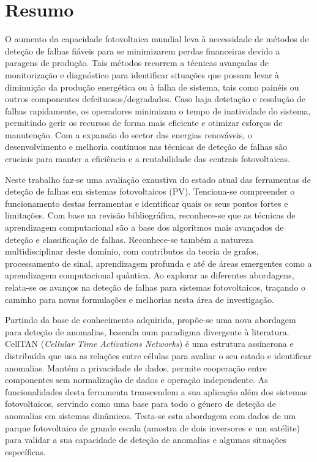 \chapter*{Resumo}

O aumento da capacidade fotovoltaica mundial leva à necessidade de métodos de deteção de falhas fiáveis para se minimizarem perdas financeiras devido a paragens de produção. Tais métodos recorrem a técnicas avançadas de monitorização e diagnóstico para identificar situações que possam levar à diminuição da produção energética ou à falha de sistema, tais como painéis ou outros componentes defeituosos/degradados. Caso haja detetação e resolução de falhas rapidamente, os operadores minimizam o tempo de inatividade do sistema, permitindo gerir os recursos de forma mais eficiente e otimizar esforços de manutenção. Com a expansão do sector das energias renováveis, o desenvolvimento e melhoria contínuos nas técnicas de deteção de falhas são cruciais para manter a eficiência e a rentabilidade das centrais fotovoltaicas.

Neste trabalho faz-se uma avaliação exaustiva do estado atual das ferramentas de deteção de falhas em sistemas fotovoltaicos (PV). Tenciona-se compreender o funcionamento destas ferramentas e identificar quais os seus pontos fortes e limitações. Com base na revisão bibliográfica, reconhece-se que as técnicas de aprendizagem computacional são a base dos algoritmos mais avançados de deteção e classificação de falhas. Reconhece-se também a natureza multidisciplinar deste domínio, com contributos da teoria de grafos, processamento de sinal, aprendizagem profunda e até de áreas emergentes como a aprendizagem computacional quântica. Ao explorar as diferentes abordagens, relata-se os avanços na deteção de falhas para sistemas fotovoltaicos, traçando o caminho para novas formulações e melhorias nesta área de investigação.

Partindo da base de conhecimento adquirida, propõe-se uma nova abordagem para deteção de anomalias, baseada num paradigma divergente à literatura. CellTAN (\textit{Cellular Time Activations Networks}) é uma estrutura assíncrona e distribuída que usa as relações entre células para avaliar o seu estado e identificar anomalias. Mantém a privacidade de dados, permite cooperação entre componentes sem normalização de dados e operação independente. As funcionalidades desta ferramenta transcendem a sua aplicação além dos sistemas fotovoltaicos, servindo como uma base para todo o género de deteção de anomalias em sistemas dinâmicos.
Testa-se esta abordagem com dados de um parque fotovoltaico de grande escala (amostra de dois inversores e um satélite) para validar a sua capacidade de deteção de anomalias e algumas situações específicas.

